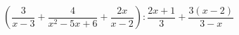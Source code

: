 \begin{ex}[type=expression]
	\begin{condition}
		\(\left( \dfrac{3}{x-3}+\dfrac{4}{x^2-5x+6}+\dfrac{2x}{x-2} \right):\dfrac{2x+1}{3}+\dfrac{3(x-2)}{3-x}\)
	\end{condition}
\end{ex}
